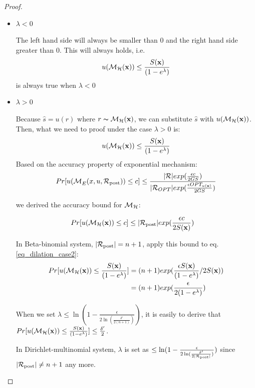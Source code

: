 \documentclass{article}
\begin{document}
\begin{proof}
\begin{itemize}
	\item $\lambda < 0$

		The left hand side will always be smaller than 0 and the right hand side greater than 0. This will always holds, i.e.
		\begin{equation*}
		u(\mathcal{M}_{\mathcal{H}}(\textbf{x})) \leq \frac{S(\textbf{x})}{(1 - e ^ {\lambda})}
		\end{equation*}
		is always true when $\lambda < 0$
	\item $\lambda > 0$


		Because $\hat{s} = u(r)$ where $r \thicksim \mathcal{M}_{\mathcal{H}}(\textbf{x})$, we can substitute $\hat{s}$ with $u(\mathcal{M}_{\mathcal{H}}(\textbf{x}))$. Then, what we need to proof under the case $\lambda > 0$ is:
		\begin{equation}
		\label{eq_dilation_case2}
		u(\mathcal{M}_{\mathcal{H}}(\textbf{x})) \leq \frac{S(\textbf{x})}{(1 - e ^ {\lambda})}
		\end{equation}
		Based on the accuracy property of exponential mechanism:
		\begin{equation*}
		\begin{split}
		Pr[u(\mathcal{M}_E^{}({x},{u},{\mathcal{R}_{\textup{post}}})) \leq c] 
		& \leq \frac{|\mathcal{R}|exp(\frac{\epsilon c}{2 GS})}{|\mathcal{R}_{OPT}| exp(\frac{\epsilon OPT_{u(\textbf{x})}}{2 GS})}\\
		\end{split}
		\end{equation*}

		we derived the accuracy bound for $\mathcal{M}_{\mathcal{H}}$:

		\begin{equation*}
		\begin{split}
		Pr[u(\mathcal{M}_{\mathcal{H}}(\textbf{x})) \leq c] 
		& \leq |\mathcal{R}_{\textup{post}}|exp(\frac{\epsilon c}{2 S(\textbf{x})})
		\end{split}
		\end{equation*}

		In Beta-binomial system, $|\mathcal{R}_{\textup{post}}| = n + 1$, apply this bound to eq. \ref{eq_dilation_case2}:
		\begin{equation*}
		\begin{split}
		Pr[u(\mathcal{M}_{\mathcal{H}}(\textbf{x})) \leq \frac{S(\textbf{x})}{(1 - e ^ {\lambda})}] 
		& = (n + 1)exp(\frac{\epsilon S(\textbf{x})}{(1 - e ^ {\lambda})}/2 S(\textbf{x}))\\
		& = (n + 1)exp(\frac{\epsilon}{2 (1 - e ^ {\lambda})})\\
		\end{split}
		\end{equation*}

		When we set $\lambda \leq \ln(1 - \frac{\epsilon}{2 \ln (\frac{\delta'}{2 (n + 1)})})$, it is easily to derive that $Pr[u(\mathcal{M}_{\mathcal{H}}(\textbf{x})) \leq \frac{S(\textbf{x})}{(1 - e ^ {\lambda})}] \leq \frac{\delta'}{2}$.

		In Dirichlet-multinomial system, $\lambda$ is set as $ \leq \ln(1 - \frac{\epsilon}{2 \ln (\frac{\delta'}{2 |\mathcal{R}_{\textup{post}}|})})$ since $|\mathcal{R}_{\textup{post}}| \neq n + 1$ any more.

\end{itemize}

\end{proof}
\end{document}
